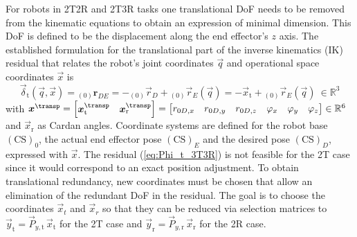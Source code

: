 \documentclass[graybox,vecphys]{svmult}
\newcommand{\ks}[1]{{(\mathrm{CS})_{#1}}}
\newcommand{\ortvek}[4]{{ }_{(#1)}{\boldsymbol{#2}}^{#3}_{#4} }
\newcommand{\Res}[0]{\vec{\delta}}
\begin{document}
For robots in 2T2R and 2T3R tasks one translational DoF needs to be removed from the kinematic equations to obtain an expression of minimal dimension. 
This DoF is defined to be the displacement along the end effector's $z$ axis.
%
The established formulation for the translational part of the inverse kinematics (IK) residual that relates the robot's joint coordinates $\vec{q}$ and operational space coordinates $\vec{x}$ is
\begin{equation}
\label{eq:Phi_t_3T3R}
{\Res_\mathrm{t}(\vec{q},\vec{x})} 
= 
\ortvek{0}{r}{}{DE}
=
-{_{(0)}\vec{r}_D} + {_{(0)}\vec{r}_E}(\vec{q}) = -\vec{x}_{\mathrm{t}} + {_{(0)}\vec{r}_E}(\vec{q}) ~\in {\mathbb{R}}^{3}
\end{equation}
with $\vec{x}^\transp
=
\begin{bmatrix}
\vec{x}_{\mathrm{t}}^\transp & 
\vec{x}_{\mathrm{r}}^\transp
\end{bmatrix}
= 
\begin{bmatrix}
r_{0D,x} & 
r_{0D,y} & 
r_{0D,z} & 
\varphi_x &
\varphi_y &
\varphi_z
\end{bmatrix}
\in {\mathbb{R}}^{6}$ and $\vec{x}_{\mathrm{r}}$ as Cardan angles.
Coordinate systems are defined for the robot base $\ks{0}$, the actual end effector pose $\ks{E}$ and the desired pose $\ks{D}$, expressed with $\vec{x}$.
The residual (\ref{eq:Phi_t_3T3R}) is not feasible for the 2T case since it would correspond to an exact position adjustment.
To obtain translational redundancy, new coordinates must be chosen that allow an elimination of the redundant DoF in the residual.
The goal is to choose the coordinates $\vec{x}_t$ and $\vec{x}_r$ so that they can be reduced via selection matrices to 
$
\vec{y}_{\mathrm{t}}
=
\vec{P}_{y,\mathrm{t}}\,\vec{x}_{\mathrm{t}}$
for the 2T case and
$
\vec{y}_{\mathrm{r}}
=
\vec{P}_{y,\mathrm{r}}\,\vec{x}_{\mathrm{r}}
$
for the 2R case.
\end{document}
